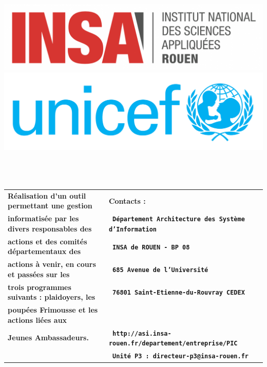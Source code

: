 \documentclass[dvipsnames,a2paper]{paper}
\begin{document}
\includegraphics[scale=0.28]{images/affiche/logo-insa.png} 
\hspace{3cm}
\includegraphics[scale=0.28]{images/affiche/logo-unicef.jpg} \\~\\~\\~\\
\centering
	\begin{longtable}{p{19.7cm}|p{19.7cm}}
	{\textbf{\Huge \textsf{R\'ealisation d'un outil permettant une gestion }}} & 
	{\textbf{\Huge \textsf{ Contacts : }}}\\
	{\textbf{\Huge \textsf{informatis\'ee par les divers responsables des }}} & 
	{\textbf{\huge \texttt{ D\'epartement Architecture des Syst\`eme d'Information }}}\\
	{\textbf{\Huge \textsf{actions et des comit\'es d\'epartementaux des }}} & 
	{\textbf{\huge \texttt{ INSA de ROUEN - BP 08 }}}\\
	{\textbf{\Huge \textsf{actions \`a venir, en cours et pass\'ees sur les }}} & 
	{\textbf{\huge \texttt{ 685 Avenue de l'Universit\'e }}}\\
	{\textbf{\Huge \textsf{trois programmes suivants : plaidoyers, les }}} & 
	{\textbf{\huge \texttt{ 76801 Saint-Etienne-du-Rouvray CEDEX }}}\\
	{\textbf{\Huge \textsf{poup\'ees Frimousse et les actions li\'ees aux }}} & 
	{\textbf{\huge \texttt{  }}}\\
	{\textbf{\Huge \textsf{Jeunes Ambassadeurs.}}} & 
	{\textbf{\huge \texttt{ http://asi.insa-rouen.fr/departement/entreprise/PIC }}}\\
	{\textbf{\Huge \textsf{}}} & 
	{\textbf{\huge \texttt{ Unit\'e P3 : directeur-p3@insa-rouen.fr }}}
\end{longtable}
~\\~\\~\\~\\~\\
\end{document}
